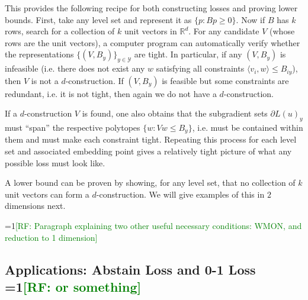 \documentclass[anon,12pt]{colt2019}
\newcommand{\Comments}{1}
\newcommand{\mynote}[2]{\ifnum\Comments=1\textcolor{#1}{#2}\fi}
\newcommand{\raf}[1]{\mynote{green}{[RF: #1]}}
\newcommand{\reals}{\mathbb{R}}
\newcommand{\Y}{\mathcal{Y}}
\begin{document}
This provides the following recipe for both constructing losses and proving lower bounds.
First, take any level set and represent it as $\{p : Bp \geq 0\}$.
Now if $B$ has $k$ rows, search for a collection of $k$ unit vectors in $\reals^d$.
For any candidate $V$ (whose rows are the unit vectors), a computer program can automatically verify whether the representations $\{(V,B_y)\}_{y \in \Y}$ are tight.
In particular, if any $(V,B_y)$ is infeasible (i.e. there does not exist any $w$ satisfying all constraints $\langle v_i, w \rangle \leq B_{iy}$), then $V$ is not a $d$-construction.
If $(V,B_y)$ is feasible but some constraints are redundant, i.e. it is not tight, then again we do not have a $d$-construction.

If a $d$-construction $V$ is found, one also obtains that the subgradient sets $\partial L(u)_y$ must ``span'' the respective polytopes $\{w : Vw \leq B_y\}$, i.e. must be contained within them and must make each constraint tight.
Repeating this process for each level set and associated embedding point gives a relatively tight picture of what any possible loss must look like.

A lower bound can be proven by showing, for any level set, that no collection of $k$ unit vectors can form a $d$-construction.
We will give examples of this in $2$ dimensions next.

\raf{Paragraph explaining two other useful necessary conditions: WMON, and reduction to 1 dimension}

\subsection{Applications: Abstain Loss and 0-1 Loss \raf{or something}}
\end{document}
